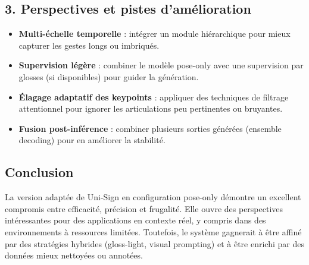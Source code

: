 \subsection*{3. Perspectives et pistes d’amélioration}

\begin{itemize}
    \item \textbf{Multi-échelle temporelle} : intégrer un module hiérarchique pour mieux capturer les gestes longs ou imbriqués.
    \item \textbf{Supervision légère} : combiner le modèle pose-only avec une supervision par glosses (si disponibles) pour guider la génération.
    \item \textbf{Élagage adaptatif des keypoints} : appliquer des techniques de filtrage attentionnel pour ignorer les articulations peu pertinentes ou bruyantes.
    \item \textbf{Fusion post-inférence} : combiner plusieurs sorties générées (ensemble decoding) pour en améliorer la stabilité.
\end{itemize}

\subsection*{Conclusion}

La version adaptée de Uni-Sign en configuration pose-only démontre un excellent compromis entre efficacité, précision et frugalité. Elle ouvre des perspectives intéressantes pour des applications en contexte réel, y compris dans des environnements à ressources limitées. Toutefois, le système gagnerait à être affiné par des stratégies hybrides (gloss-light, visual prompting) et à être enrichi par des données mieux nettoyées ou annotées.
